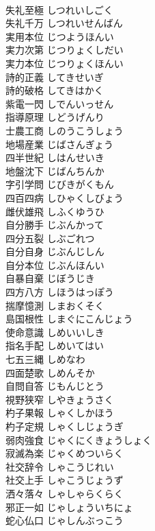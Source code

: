 \documentclass[8pt]{extreport}
\begin{document}
\begin{CJK}{UTF8}{min}
\\	失礼至極	しつれいしごく	
\\	失礼千万	しつれいせんばん	
\\	実用本位	じつようほんい	
\\	実力次第	じつりょくしだい	
\\	実力本位	じつりょくほんい	
\\	詩的正義	してきせいぎ	
\\	詩的破格	してきはかく	
\\	紫電一閃	しでんいっせん	
\\	指導原理	しどうげんり	
\\	士農工商	しのうこうしょう	
\\	地場産業	じばさんぎょう	
\\	四半世紀	しはんせいき	
\\	地盤沈下	じばんちんか	
\\	字引学問	じびきがくもん	
\\	四百四病	しひゃくしびょう	
\\	雌伏雄飛	しふくゆうひ	
\\	自分勝手	じぶんかって	
\\	四分五裂	しぶごれつ	
\\	自分自身	じぶんじしん	
\\	自分本位	じぶんほんい	
\\	自暴自棄	じぼうじき	
\\	四方八方	しほうはっぽう	
\\	揣摩憶測	しまおくそく	
\\	島国根性	しまぐにこんじょう	
\\	使命意識	しめいいしき	
\\	指名手配	しめいてはい	
\\	七五三縄	しめなわ	
\\	四面楚歌	しめんそか	
\\	自問自答	じもんじとう	
\\	視野狭窄	しやきょうさく	
\\	杓子果報	しゃくしかほう	
\\	杓子定規	しゃくしじょうぎ	
\\	弱肉強食	じゃくにくきょうしょく	
\\	寂滅為楽	じゃくめついらく	
\\	社交辞令	しゃこうじれい	
\\	社交上手	しゃこうじょうず	
\\	洒々落々	しゃしゃらくらく	
\\	邪正一如	じゃしょういちにょ	
\\	蛇心仏口	じゃしんぶっこう	

\end{CJK}
\end{document}
